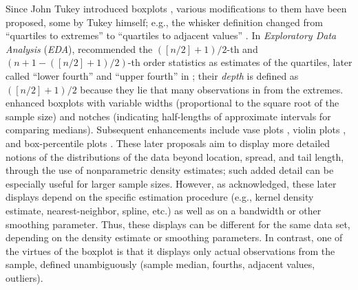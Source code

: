 \documentclass[oneside]{article}
\begin{document}
Since John Tukey introduced boxplots \citep{tukey:1970,tukey72}, various modifications to them have been proposed, some by Tukey himself; e.g., the whisker definition changed from ``quartiles to extremes'' \citep{tukey72} to ``quartiles to adjacent values'' \citep{eda}. In \textit{Exploratory Data Analysis} (\textit{EDA}), \citet{eda} recommended the $([n/2] + 1)/2$-th and $(n + 1 - ([n/2] + 1)/2)$-th order statistics as estimates of the quartiles, later called ``lower fourth'' and ``upper fourth'' in \citet{ureda}; their \textit{depth} is defined as $([n/2] + 1)/2$ because they lie that many observations in from the extremes. \citet{variations.boxplots} enhanced boxplots with variable widths (proportional to the square root of the sample size) and notches (indicating half-lengths of approximate intervals for comparing medians). Subsequent enhancements include vase plots \citep{vase}, violin plots \citep{violin}, and box-percentile plots \citep{box.percentiles}. These later proposals aim to display more detailed notions of the distributions of the data beyond location, spread, and tail length, through the use of nonparametric density estimates; such added detail can be especially useful for larger sample sizes. However, as \citet{vase} acknowledged, these later displays depend on the specific estimation procedure (e.g., kernel density estimate, nearest-neighbor, spline, etc.) as well as on a bandwidth or other smoothing parameter. Thus, these displays can be different for the same data set, depending on the density estimate or smoothing parameters. In contrast, one of the virtues of the boxplot is that it displays only actual observations from the sample, defined unambiguously (sample median, fourths, adjacent values, outliers).
\end{document}
